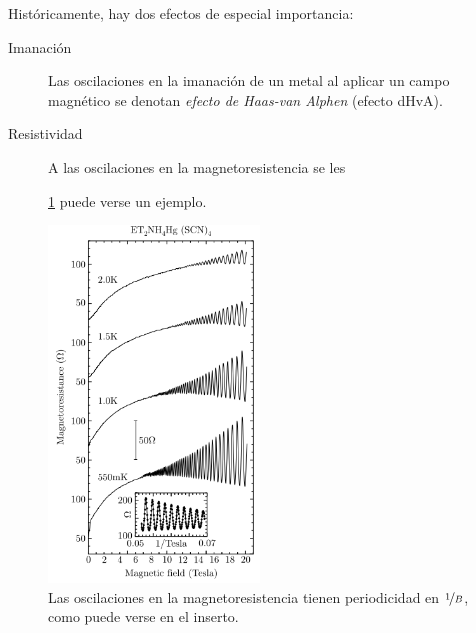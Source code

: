 Históricamente, hay dos efectos de especial importancia:
\begin{description}
\item[Imanación] Las oscilaciones en la imanación de un metal al
  aplicar un campo magnético se denotan \emph{efecto de Haas-van
    Alphen} (efecto dHvA).
\item[Resistividad] A las oscilaciones en la magnetoresistencia se les

  \ref{fig:sdh} puede verse un ejemplo.
\end{description}

\begin{figure}
  \centering
  \includegraphics[width=0.5\textwidth]{figures/sdh.png}
  \caption{Las oscilaciones en la magnetoresistencia tienen
    periodicidad en $\nicefrac{1}{B}$, como puede verse en el inserto.}
  \label{fig:sdh}
\end{figure}
